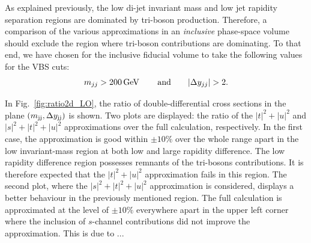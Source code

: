 As explained previously, the low di-jet invariant mass and low jet rapidity separation regions are dominated by tri-boson production.
Therefore, a comparison of the various approximations in an \emph{inclusive} phase-space volume should exclude the region where tri-boson contributions are dominating.
To that end, we have chosen for the inclusive fiducial volume to take the following values for the VBS cuts:
%
\begin{equation}
\label{eq:inclusive}
	m_{jj} > 200\,\text{GeV}\, \qquad {\rm and} \qquad |\Delta y_{jj}| > 2 .
\end{equation}

In Fig.~\ref{fig:ratio2d_LO}, the ratio of double-differential cross sections in the plane $\left(m_{\text{j}\text{j}}, \Delta y_{\text{j}\text{j}}\right)$ is shown.
Two plots are displayed: the ratio of the $|t|^2 + |u|^2$ and $|s|^2 + |t|^2 + |u|^2$ approximations over the full calculation, respectively.
In the first case, the approximation is good within $\pm10\%$ over the whole range apart in the low invariant-mass region at both low and large rapidity difference.
The low rapidity difference region possesses remnants of the tri-bosons contributions.
It is therefore expected that the $|t|^2 + |u|^2$ approximation fails in this region.
The second plot, where the $|s|^2 + |t|^2 + |u|^2$ approximation is considered, displays a better behaviour in the previously mentioned region.
The full calculation is approximated at the level of $\pm10\%$ everywhere apart in the upper left corner where the inclusion of $s$-channel contributions did not improve the approximation.
This is due to ...  

